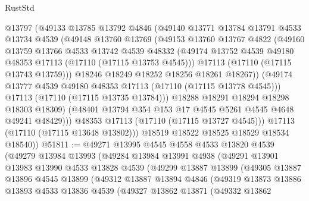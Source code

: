 \begin{lexlean}{RustStd}
\begin{coremodule}
                @13797
                (@49133
                  @13785
                  @13792
                  @4846
                  (@49140
                    @13771
                    @13784
                    @13791
                    @4533
                    @13734
                    @4539
                    (@49148
                      @13760
                      @13769
                      (@49153
                        @13760
                        @13767
                        @4822
                        (@49160
                          @13759
                          @13766
                          @4533
                          @13742
                          @4539
                          @48332
                          (@49174 @13752 @4539 @49180 @48353 @17113 (@17110 (@17115 @13753 @4545)))
                          @17113
                          (@17110 (@17115 @13743 @13759)))
                        @18246
                        @18249
                        @18252
                        @18256
                        @18261
                        @18267))
                    (@49174 @13777 @4539 @49180 @48353 @17113 (@17110 (@17115 @13778 @4545)))
                    @17113
                    (@17110 (@17115 @13735 @13784)))
                  @18288
                  @18291
                  @18294
                  @18298
                  @18303
                  @18309)
                (@48401 @13794 @354 @153 @17 @4545 @5261 @4545 @4648 @49241 @48429)))
            @48353
            @17113
            (@17110 (@17115 @13727 @4545)))
          @17113
          (@17110 (@17115 @13648 @13802)))
        @18519
        @18522
        @18525
        @18529
        @18534
        @18540))
@51811 := @49271
    @13995
    @4545
    @4558
    @4533
    @13820
    @4539
    (@49279
      @13984
      @13993
      (@49284
        @13984
        @13991
        @4938
        (@49291
          @13901
          @13983
          @13990
          @4533
          @13828
          @4539
          (@49299
            @13887
            @13899
            (@49305
              @13887
              @13896
              @4545
              @13899
              (@49312
                @13887
                @13894
                @4846
                (@49319
                  @13873
                  @13886
                  @13893
                  @4533
                  @13836
                  @4539
                  (@49327
                    @13862
                    @13871
                    (@49332
                      @13862

\end{coremodule}
\end{lexlean}
